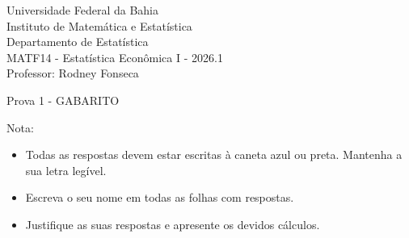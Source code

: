 \documentclass{article}
\date{--/--/----} %
\begin{document}
\begin{flushleft}
	Universidade Federal da Bahia\\
	Instituto de Matemática e Estatística\\
	Departamento de Estatística\\
	MATF14 - Estatística Econômica I - 2026.1\\
	Professor: Rodney Fonseca \\
\end{flushleft}

\begin{center}
	\begin{Large}
		Prova 1 {\color{blue} - GABARITO} \\
	\end{Large}	
\end{center}

\hspace{2em} Nota: 

\vspace{1em}

\begin{flushleft}
\begin{small}

\begin{itemize}
	\item Todas as respostas devem estar escritas à caneta azul ou preta. Mantenha a sua letra legível.
	\item Escreva o seu nome em todas as folhas com respostas.
	\item Justifique as suas respostas e apresente os devidos cálculos.
\end{itemize}

\end{small}
\end{flushleft}

\vspace{1em}

\end{document}
